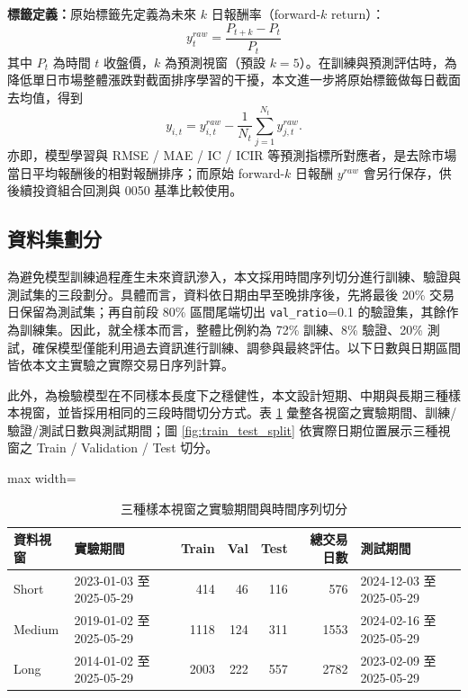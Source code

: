 \textbf{標籤定義：}原始標籤先定義為未來 $k$ 日報酬率（forward-$k$ return）：
\begin{equation}
y^{raw}_t = \frac{P_{t+k} - P_t}{P_t}
\label{eq:return_raw}
\end{equation}
其中 $P_t$ 為時間 $t$ 收盤價，$k$ 為預測視窗（預設 $k=5$）。在訓練與預測評估時，為降低單日市場整體漲跌對截面排序學習的干擾，本文進一步將原始標籤做每日截面去均值，得到
\begin{equation}
y_{i,t} = y^{raw}_{i,t} - \frac{1}{N_t}\sum_{j=1}^{N_t} y^{raw}_{j,t}.
\label{eq:return_demean}
\end{equation}
亦即，模型學習與 RMSE / MAE / IC / ICIR 等預測指標所對應者，是去除市場當日平均報酬後的相對報酬排序；而原始 forward-$k$ 日報酬 \(y^{raw}\) 會另行保存，供後續投資組合回測與 0050 基準比較使用。



\subsection{資料集劃分}
\label{subsec:split}
\FloatBarrier

為避免模型訓練過程產生未來資訊滲入，本文採用時間序列切分進行訓練、驗證與測試集的三段劃分。具體而言，資料依日期由早至晚排序後，先將最後 20\% 交易日保留為測試集；再自前段 80\% 區間尾端切出 \texttt{val\_ratio}=0.1 的驗證集，其餘作為訓練集。因此，就全樣本而言，整體比例約為 72\% 訓練、8\% 驗證、20\% 測試，確保模型僅能利用過去資訊進行訓練、調參與最終評估。以下日數與日期區間皆依本文主實驗之實際交易日序列計算。

此外，為檢驗模型在不同樣本長度下之穩健性，本文設計短期、中期與長期三種樣本視窗，並皆採用相同的三段時間切分方式。表 \ref{tab:dataset_split_windows} 彙整各視窗之實驗期間、訓練/驗證/測試日數與測試期間；圖 \ref{fig:train_test_split} 依實際日期位置展示三種視窗之 Train / Validation / Test 切分。

\begin{table}[H]
\centering
\caption{三種樣本視窗之實驗期間與時間序列切分}
\label{tab:dataset_split_windows}
\small
\begin{adjustbox}{max width=\textwidth}
\begin{tabular}{llrrrrl}
\toprule
資料視窗 & 實驗期間 & Train & Val & Test & 總交易日數 & 測試期間 \\
\midrule
Short & 2023-01-03 至 2025-05-29 & 414 & 46 & 116 & 576 & 2024-12-03 至 2025-05-29 \\
Medium & 2019-01-02 至 2025-05-29 & 1118 & 124 & 311 & 1553 & 2024-02-16 至 2025-05-29 \\
Long & 2014-01-02 至 2025-05-29 & 2003 & 222 & 557 & 2782 & 2023-02-09 至 2025-05-29 \\
\bottomrule
\end{tabular}
\end{adjustbox}
\end{table}


